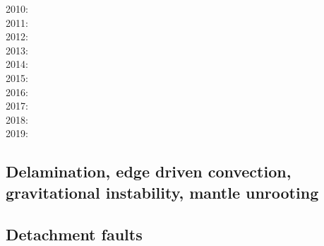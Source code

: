{2010: \cite{hamo10}\cite{fasm10}\cite{grpy10}\cite{vago10}\cite{plmf10}\cite{spgs10a}\cite{pygp10}
      \cite{jabw10}\\
2011: \cite{rera11}\cite{chss11}\\
2012: \cite{wagw12}\cite{vacl12}\cite{buit12}\cite{kogp12}\cite{gohg12}\cite{trub12}\\
2013: \cite{wazh13}\cite{krcu13}\cite{frbm13}\cite{wagw13}\cite{duyp13}\cite{rugb13}
      \cite{scdg13}\\
2014: \cite{kava14}\cite{dusp14}\cite{wavp14}\cite{whbb14}\cite{scml14}
      \cite{mals14}\cite{gupm14}\cite{gahs14}\cite{mutg14}\\
2015: \cite{wavp15}\cite{thkp15}\cite{mags15}\cite{duys15}\cite{dusp15}\\
2016: \cite{wahz16}\\
2017: \cite{rugb17}\cite{ozgw17}\cite{vomc17}\cite{taac17}\cite{ithc17}\\
2018: \cite{wavp18}\cite{nigw18}\cite{bemc18}\cite{neew18}\\
2019: \cite{koen19}\cite{kipd19}\cite{crcm19}\cite{pedm19}\cite{mazz19}\cite{chch19}
}

\subsection{Delamination, edge driven convection, gravitational instability, mantle unrooting} 

{\scriptsize
\noindent
\cite{kian95}
\cite{homo97}
\cite{kian98}\cite{scsc98}\cite{mafs98}
\cite{kiri00}\cite{scys00}
\cite{modo04}
\cite{elki07}
\cite{gopy08}\cite{vavg08}
\cite{vabv10}
\cite{lesm11}
\cite{krcu13}\cite{sths13}
\cite{baeg14}\cite{kava14}
\cite{wahz15}
\cite{bems17}
\cite{peka18}
}

\subsection{Detachment faults} 

